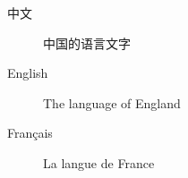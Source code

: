 \begin{description}
  \item[中文] 中国的语言文字
  \item[English] The language of England
  \item[Français] La langue de France
\end{description}
